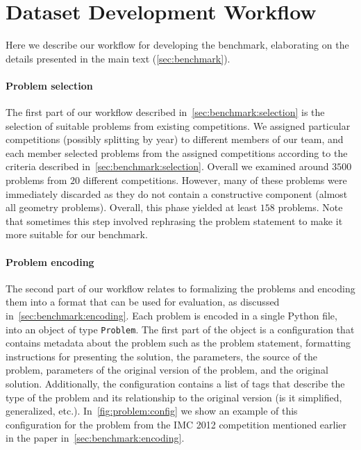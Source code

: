 \section{Dataset Development Workflow}\label{app:workflow}

Here we describe our workflow for developing the \mc benchmark, elaborating on the details presented in the main text (\cref{sec:benchmark}). 

\paragraph{Problem selection}
The first part of our workflow described in~\cref{sec:benchmark:selection} is the selection of suitable problems from existing competitions.
We assigned particular competitions (possibly splitting by year) to different members of our team, and each member selected problems from the assigned competitions according to the criteria described in~\cref{sec:benchmark:selection}.
Overall we examined around $3500$ problems from $20$ different competitions. However, many of these problems were immediately discarded as they do not contain a constructive component (\eg almost all geometry problems). Overall, this phase yielded at least $158$ problems.
Note that sometimes this step involved rephrasing the problem statement to make it more suitable for our benchmark.

\paragraph{Problem encoding}
The second part of our workflow relates to formalizing the problems and encoding them into a format that can be used for evaluation, as discussed in~\cref{sec:benchmark:encoding}.
Each problem is encoded in a single Python file, into an object of type \texttt{Problem}.
The first part of the object is a configuration that contains metadata about the problem such as the problem statement, formatting instructions for presenting the solution, the parameters, the source of the problem, parameters of the original version of the problem, and the original solution.
Additionally, the configuration contains a list of tags that describe the type of the problem and its relationship to the original version (is it simplified, generalized, etc.).
In~\cref{fig:problem:config} we show an example of this configuration for the problem from the IMC 2012 competition mentioned earlier in the paper in~\cref{sec:benchmark:encoding}.


